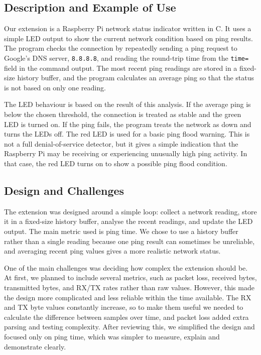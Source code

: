 \documentclass[11pt]{article}
\newcommand{\code}[1]{\texttt{#1}}
\begin{document}
\subsection{Description and Example of Use}

Our extension is a Raspberry Pi network status indicator written in C. It uses a simple LED output to show the current network condition based on ping results. The program checks the connection by repeatedly sending a ping request to Google’s DNS server, \code{8.8.8.8}, and reading the round-trip time from the \code{time=} field in the command output. The most recent ping readings are stored in a fixed-size history buffer, and the program calculates an average ping so that the status is not based on only one reading. 

The LED behaviour is based on the result of this analysis. If the average ping is below the chosen threshold, the connection is treated as stable and the green LED is turned on. If the ping fails, the program treats the network as down and turns the LEDs off. The red LED is used for a basic ping flood warning. This is not a full denial-of-service detector, but it gives a simple indication that the Raspberry Pi may be receiving or experiencing unusually high ping activity. In that case, the red LED turns on to show a possible ping flood condition. 

\subsection{Design and Challenges}

The extension was designed around a simple loop: collect a network reading, store it in a fixed-size history buffer, analyse the recent readings, and update the LED output. The main metric used is ping time. We chose to use a history buffer rather than a single reading because one ping result can sometimes be unreliable, and averaging recent ping values gives a more realistic network status.

One of the main challenges was deciding how complex the extension should be. At first, we planned to include several metrics, such as packet loss, received bytes, transmitted bytes, and RX/TX rates rather than raw values. However, this made the design more complicated and less reliable within the time available. The RX and TX byte values constantly increase, so to make them useful we needed to calculate the difference between samples over time, and packet loss added extra parsing and testing complexity. After reviewing this, we simplified the design and focused only on ping time, which was simpler to measure, explain and demonstrate clearly.
\end{document}
